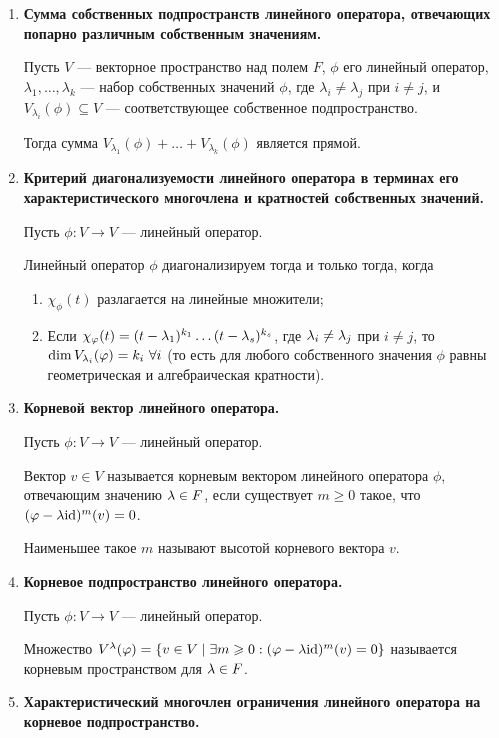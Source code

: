 \begin{enumerate}
\item \textbf{Сумма собственных подпространств линейного оператора, отвечающих попарно различным собственным значениям.}

Пусть $V$ --- векторное пространство над полем $F$, $\phi$ его линейный оператор, $\lambda_1, \ldots, \lambda_k$ --- набор собственных значений $\phi$, где $\lambda_i \neq \lambda_j$ при $i \neq j$, и $V_{\lambda_i}(\phi) \subseteq V$ --- соответствующее собственное подпространство.

Тогда сумма $V_{\lambda_1}(\phi) + \ldots + V_{\lambda_k}(\phi)$ является прямой.

\item \textbf{Критерий диагонализуемости линейного оператора в терминах его характеристического многочлена и кратностей собственных значений.}

Пусть $\phi\colon V \rightarrow V$ --- линейный оператор.

Линейный оператор $\phi$ диагонализируем тогда и только тогда, когда 
\begin{enumerate}
\item $\chi_\phi(t)$ разлагается на линейные множители;
\item Если $\chi_\varphi(t) = (t - \lambda_1)^{k_1}\dots(t - \lambda_s)^{k_s}$, где $\lambda_i \neq \lambda_j$ при $i \neq j$, то $\dim V_{\lambda_i}(\varphi) = k_i \ \forall i$ (то есть для любого собственного значения $\phi$ равны геометрическая и алгебраическая кратности).
\end{enumerate}

\item \textbf{Корневой вектор линейного оператора.}

Пусть $\phi\colon V \rightarrow V$ --- линейный оператор.

Вектор $v \in V$ называется корневым вектором линейного оператора $\phi$, отвечающим значению $\lambda \in F$, если существует $m \geqslant 0$ такое, что $(\varphi - \lambda\mathrm{id})^m(v) = 0$.

Наименьшее такое $m$ называют высотой корневого вектора $v$.

\item \textbf{Корневое подпространство линейного оператора.}

Пусть $\phi\colon V \rightarrow V$ --- линейный оператор.

Множество $V^\lambda(\varphi) = \{ v \in V \mid \exists m \geqslant 0  : (\varphi - \lambda\mathrm{id})^m(v) = 0 \}$ называется корневым пространством для $\lambda \in F$.

\item \textbf{Характеристический многочлен ограничения линейного оператора на корневое подпространство.}


\end{enumerate}
